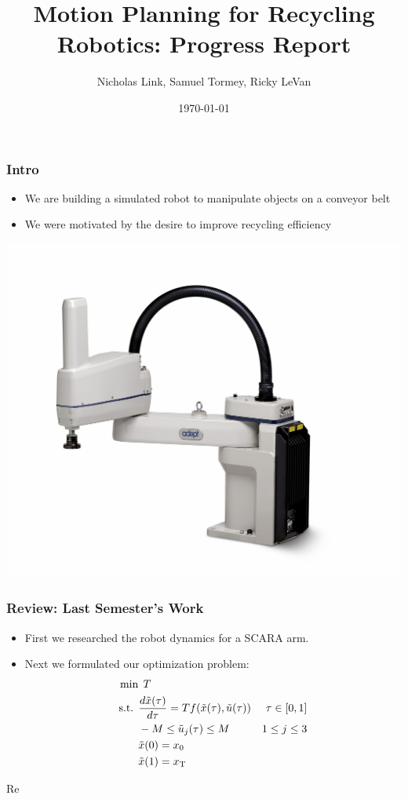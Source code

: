 \documentclass{beamer}
\title[Recycle Robot]{Motion Planning for Recycling Robotics: Progress Report} %
\author[Link, Tormey, LeVan]{Nicholas Link, Samuel Tormey, Ricky LeVan} %
\date{\today} %
\newcommand{\ut}[1]{\ensuremath{\tilde{#1}}}
\begin{document}
\begin{frame}
\titlepage %

\end{frame}

\begin{frame}
\frametitle{Intro}
\begin{itemize}
\item We are building a simulated robot to manipulate objects on a conveyor belt
\item We were motivated by the desire to improve recycling efficiency
\end{itemize}
\begin{centering}
\includegraphics[width=0.55\linewidth,height=0.55\textheight,keepaspectratio]{scara.jpg}

\end{centering}

\end{frame}


\begin{frame}
\frametitle{Review: Last Semester's Work}
\begin{itemize}
\item First we researched the robot dynamics for a SCARA arm.

\item Next we formulated our optimization problem:
\begin{align*}
\min  & \: \:T \\
\mbox{s.t. } & \frac{d\ut{x}(\tau)}{d\tau} = Tf(\ut{x}(\tau),\ut{u}(\tau))  &\tau \in [0,1] \\
& -M \leq \ut{u}_j(\tau) \leq M  & 1 \leq j \leq 3 \\
& \ut{x}(0) = x_0 \\
& \ut{x}(1) = x_{\scriptsize\mbox{T}} 
\end{align*}

\end{itemize}Re

\end{frame}
\end{document}
